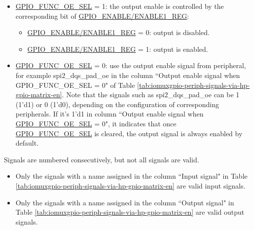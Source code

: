 \documentclass[main\_\_EN.tex]{subfiles}
\begin{document}
\begin{itemize}
    \item \hyperref[fielddesc:GPIOFUNCNOESEL]{GPIO\_FUNC\_OE\_SEL} = 1: the output enable is controlled by the corresponding bit  of \hyperref[regdesc:GPIOENABLEREG]{GPIO\_ENABLE/ENABLE1\_REG}:
    \begin{itemize}
        \item \hyperref[regdesc:GPIOENABLEREG]{GPIO\_ENABLE/ENABLE1\_REG} = 0: output is disabled.
        \item \hyperref[regdesc:GPIOENABLEREG]{GPIO\_ENABLE/ENABLE1\_REG} = 1: output is enabled.
    \end{itemize}
    \item \hyperref[fielddesc:GPIOFUNCNOESEL]{GPIO\_FUNC\_OE\_SEL} = 0: use the output enable signal from peripheral, for example spi2\_dqs\_pad\_oe in the column ``Output enable signal when GPIO\_FUNC\_OE\_SEL = 0" of Table \ref{tab:iomuxgpio-periph-signals-via-hp-gpio-matrix-en}. Note that the signals such as spi2\_dqs\_pad\_oe can be 1 (1'd1) or 0 (1'd0), depending on the configuration of corresponding peripherals. If it's 1'd1 in column ``Output enable signal when \hyperref[fielddesc:GPIOFUNCNOESEL]{GPIO\_FUNC\_OE\_SEL} = 0", it indicates that once  \hyperref[fielddesc:GPIOFUNCNOESEL]{GPIO\_FUNC\_OE\_SEL} is cleared, the output signal is always enabled by default.
\end{itemize}

\begin{tiplisting}
Signals are numbered consecutively, but not all signals are valid.
\vspace{-1em}
\begin{itemize}
    \item Only the signals with a name assigned in the column ``Input signal" in Table \ref{tab:iomuxgpio-periph-signals-via-hp-gpio-matrix-en} are valid input signals.
    \item Only the signals with a name assigned in the column ``Output signal" in Table \ref{tab:iomuxgpio-periph-signals-via-hp-gpio-matrix-en} are valid output signals.
\end{itemize}
\end{tiplisting}

\begin{landscape}


\tableheaderHPSignalEN
\tablecontentHPSignal

\end{landscape}
\end{document}
